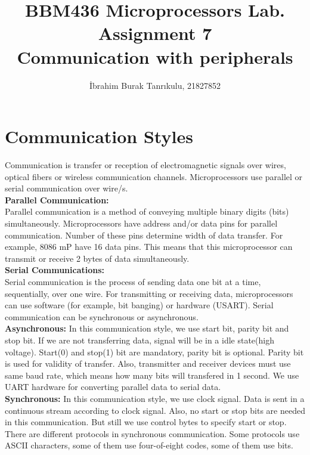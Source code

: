 \documentclass[11pt]{article}
\begin{document}
\author{İbrahim Burak Tanrıkulu, 21827852}
\title{BBM436 Microprocessors Lab.\\Assignment 7\\Communication with peripherals}
\maketitle

\section{Communication Styles}
Communication is transfer or reception of electromagnetic signals over wires, optical fibers or wireless communication channels. Microprocessors use parallel or serial communication over wire/s.\\

{\bf Parallel Communication: }\\
Parallel communication is a method of conveying multiple binary digits (bits) simultaneously. Microprocessors have address and/or data pins for parallel communication. Number of these pins determine width of data transfer. For example, 8086 mP have 16 data pins. This means that this microprocessor can transmit or receive 2 bytes of data simultaneously.\\

{\bf Serial Communications: }\\
Serial communication is the process of sending data one bit at a time, sequentially, over one wire. For transmitting or receiving data, microprocessors can use software (for example, bit banging) or hardware (USART). Serial communication can be synchronous or asynchronous.\\

{\bf Asynchronous:} In this communication style, we use start bit, parity bit and stop bit. If we are not transferring data, signal will be in a idle state(high voltage). Start(0) and stop(1) bit are mandatory, parity bit is optional. Parity bit is used for validity of transfer. Also, transmitter and receiver devices must use same baud rate, which means how many bits will transfered in 1 second. We use UART hardware for converting parallel data to serial data.\\

{\bf Synchronous:} In this communication style, we use clock signal. Data is sent in a continuous stream according to clock signal. Also, no start or stop bits are needed in this communication. But still we use control bytes to specify start or stop. There are different protocols in synchronous communication. Some protocols use ASCII characters, some of them use four-of-eight codes, some of them use bits.\\
\end{document}
